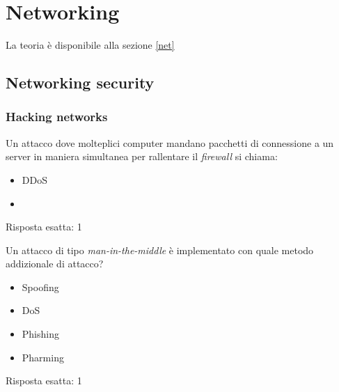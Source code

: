 \chapter{Networking}
\label{EsNet}

La teoria è disponibile alla sezione \ref{net}

\section{Networking security}

\subsection{Hacking networks}

\label{EsHacknet}

\begin{Exercise} [
  title={Quiz},
  label={net1}
  ]
  
  \Question Un attacco dove molteplici computer mandano pacchetti di 
connessione a un server in maniera simultanea per rallentare il 
\textit{firewall} si chiama:
\begin{itemize}
 \item DDoS
 \item {}
\end{itemize}

\end{Exercise}


\begin{Answer} [
  ref={net1},
  number={1}
  ]
  
  \Question Risposta esatta: 1
  
\end{Answer}



\begin{Exercise} [
  title={Quiz},
  label={net2}
  ]
  
  \Question Un attacco di tipo \textit{man-in-the-middle} è implementato con 
quale metodo addizionale di attacco?
\begin{itemize}
 \item Spoofing
 \item DoS
 \item Phishing
 \item Pharming
\end{itemize}

\end{Exercise}


\begin{Answer} [
  ref={net2},
  number={2}
  ]
  
  \Question Risposta esatta: 1
  
\end{Answer}

